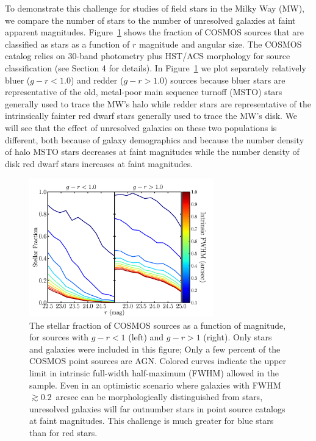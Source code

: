 \documentclass[12pt,preprint]{aastex}
\begin{document}
To demonstrate this challenge for studies of field stars in the Milky Way (MW),
we compare the number of stars to the number of unresolved galaxies at
faint apparent magnitudes.  Figure~\ref{fig:stellarfraction} shows the
fraction of COSMOS sources that are classified as stars as a function of $r$
magnitude and angular size.  The COSMOS catalog \citep[($l,b$) $\sim$ (237,43)
degrees, ][]{capak07a,scoville07b,ilbert09} relies on 30-band photometry
plus HST/ACS morphology for source classification (see Section 4 for
details).  In Figure~\ref{fig:stellarfraction} we plot separately relatively 
bluer ($g-r < 1.0$) and redder ($g-r > 1.0$) sources because bluer stars are 
representative of the old, metal-poor main sequence turnoff (MSTO) stars 
generally used to trace the MW's halo while redder stars are representative of the
intrinsically fainter red dwarf stars generally used to trace the MW's
disk.  We will see that the effect of unresolved galaxies on these two
populations is different, both because of galaxy demographics and
because the number density of halo MSTO stars decreases at faint
magnitudes while the number density of disk red dwarf stars increases at
faint magnitudes.
\begin{figure}
\centering
 \includegraphics[clip=true, trim=0cm 0cm 0.0cm 0.cm,width=8cm]{fig1.pdf}
\caption{The stellar fraction of COSMOS sources as a function of
  magnitude, for sources with $g-r<1$ (left) and $g-r>1$ (right).
  Only stars and galaxies were included in this figure; Only a few
  percent of the COSMOS point sources are AGN.  Colored curves
  indicate the upper limit in intrinsic full-width half-maximum
  (FWHM) allowed in the sample.  Even in an optimistic scenario where
  galaxies with FWHM $\gtrsim 0.2$~arcsec can be morphologically distinguished
  from stars, unresolved galaxies will far outnumber stars in point
  source catalogs at faint magnitudes.  This challenge is much greater
  for blue stars than for red stars.}
\label{fig:stellarfraction}
\end{figure}
 
\end{document}
